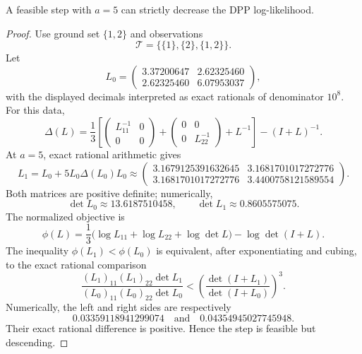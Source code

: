 \begin{theorem}\label{thm:dpp}
A feasible step with $a=5$ can strictly decrease the DPP log-likelihood.
\end{theorem}
\begin{proof}
Use ground set $\{1,2\}$ and observations
\[
\mathcal T=\bigl\{\{1\},\{2\},\{1,2\}\bigr\}.
\]
Let
\[
L_0=\begin{pmatrix}3.37200647&2.62325460\\2.62325460&6.07953037\end{pmatrix},
\]
with the displayed decimals interpreted as exact rationals of denominator $10^8$.  For this data,
\[
\Delta(L)=\frac13\left[
\begin{pmatrix}L_{11}^{-1}&0\\0&0\end{pmatrix}
+\begin{pmatrix}0&0\\0&L_{22}^{-1}\end{pmatrix}+L^{-1}\right]-(I+L)^{-1}.
\]
At $a=5$, exact rational arithmetic gives
\[
L_1=L_0+5L_0\Delta(L_0)L_0
\approx\begin{pmatrix}
3.1679125391632645&3.1681701017272776\\
3.1681701017272776&3.4400758121589554
\end{pmatrix}.
\]
Both matrices are positive definite; numerically,
\[
\det L_0\approx13.6187510458,\qquad
\det L_1\approx0.8605575075.
\]
The normalized objective is
\[
\phi(L)=\frac13\bigl(\log L_{11}+\log L_{22}+\log\det L\bigr)-\log\det(I+L).
\]
The inequality $\phi(L_1)<\phi(L_0)$ is equivalent, after exponentiating and cubing, to the exact rational comparison
\[
\frac{(L_1)_{11}(L_1)_{22}\det L_1}{(L_0)_{11}(L_0)_{22}\det L_0}
<\left(\frac{\det(I+L_1)}{\det(I+L_0)}\right)^3.
\]
Numerically, the left and right sides are respectively
\[
0.03359118941299074
\quad\text{and}\quad
0.04354945027745948.
\]
Their exact rational difference is positive.  Hence the step is feasible but descending.
\end{proof}
